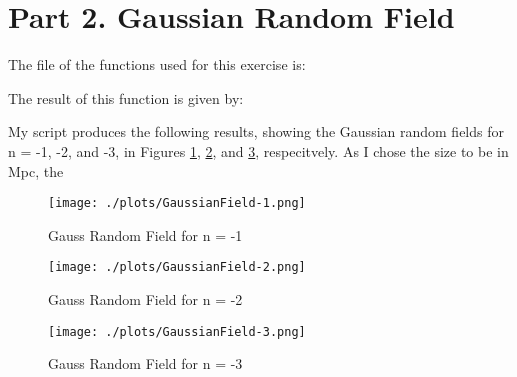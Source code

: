 \section{Part 2. Gaussian Random Field}

The file of the functions used for this exercise is:



The result of this function is given by:

My script produces the following results, showing the Gaussian random fields for n = -1, -2, and -3, in Figures \ref{fig:gauss1}, \ref{fig:gauss2}, and \ref{fig:gauss3}, respecitvely.
As I chose the size to be in Mpc, the


\begin{figure}[h!]
  \centering
  \texttt{[image: ./plots/GaussianField-1.png]}
  \caption{Gauss Random Field for n = -1}
  \label{fig:gauss1}
\end{figure}

\begin{figure}[h!]
  \centering
  \texttt{[image: ./plots/GaussianField-2.png]}
  \caption{Gauss Random Field for n = -2}
  \label{fig:gauss2}
\end{figure}

\begin{figure}[h!]
  \centering
  \texttt{[image: ./plots/GaussianField-3.png]}
  \caption{Gauss Random Field for n = -3}
  \label{fig:gauss3}
\end{figure}

